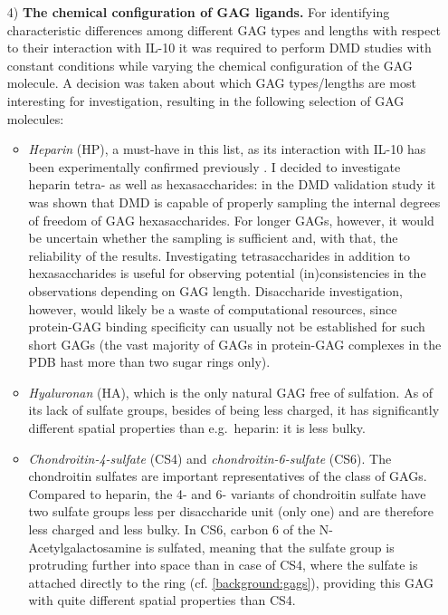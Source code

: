 \begin{itemize}


\item[4)] \textbf{The chemical configuration of GAG ligands.} For identifying
characteristic differences among different GAG types and lengths with respect to
their interaction with IL-10 it was required to perform DMD studies with
constant conditions while varying the chemical configuration of the GAG
molecule. A decision was taken about which GAG types/lengths are most
interesting for investigation, resulting in the following selection of GAG
molecules:

\begin{itemize}

\item \textit{Heparin} (HP), a must-have in this list, as its interaction with
IL-10 has been experimentally confirmed previously \cite{salek_ardakani_2000}. I
decided to investigate heparin tetra- as well as hexasaccharides: in the DMD
validation study it was shown that DMD is capable of properly sampling the
internal degrees of freedom of GAG hexasaccharides. For longer GAGs, however, it
would be uncertain whether the sampling is sufficient and, with that, the
reliability of the results. Investigating tetrasaccharides in addition to
hexasaccharides is useful for observing potential (in)consistencies in the
observations depending on GAG length. Disaccharide investigation, however, would
likely be a waste of computational resources, since protein-GAG binding
specificity can usually not be established for such short GAGs (the vast
majority of GAGs in protein-GAG complexes in the PDB hast more than two sugar
rings only).

\item \textit{Hyaluronan} (HA), which is the only natural GAG free of sulfation.
As of its lack of sulfate groups, besides of being less charged, it has
significantly different spatial properties than e.g.\ heparin: it is less bulky.

\item \textit{Chondroitin-4-sulfate} (CS4) and \textit{chondroitin-6-sulfate}
(CS6). The chondroitin sulfates are important representatives of the class of
GAGs. Compared to heparin, the 4- and 6- variants of chondroitin sulfate have
two sulfate groups less per disaccharide unit (only one) and are therefore less
charged and less bulky. In CS6, carbon 6 of the N-Acetyl\-ga\-lacto\-sa\-mine is
sulfated, meaning that the sulfate group is protruding further into space than
in case of CS4, where the sulfate is attached directly to the ring (cf.
\cref{background:gags}), providing this GAG with quite different spatial
properties than CS4.

\end{itemize}

\end{itemize}

